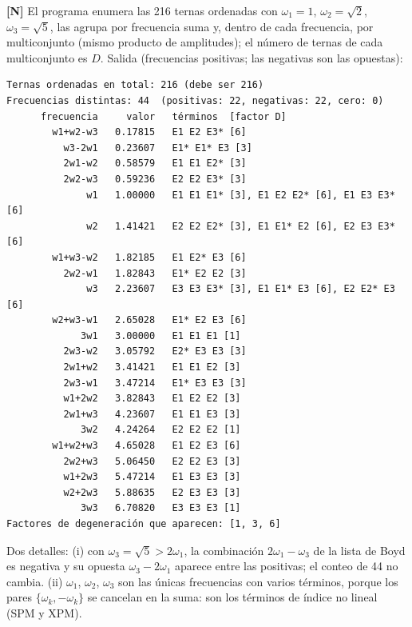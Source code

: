  \textbf{[N]} El programa enumera las 216 ternas ordenadas con $\omega_1=1$, $\omega_2=\sqrt2$, $\omega_3=\sqrt5$, las agrupa por frecuencia suma y, dentro de cada frecuencia, por multiconjunto (mismo producto de amplitudes); el número de ternas de cada multiconjunto es $D$.
Salida (frecuencias positivas; las negativas son las opuestas):
\begin{Verbatim}
Ternas ordenadas en total: 216 (debe ser 216)
Frecuencias distintas: 44  (positivas: 22, negativas: 22, cero: 0)
      frecuencia     valor   términos  [factor D]
        w1+w2-w3   0.17815   E1 E2 E3* [6]
          w3-2w1   0.23607   E1* E1* E3 [3]
          2w1-w2   0.58579   E1 E1 E2* [3]
          2w2-w3   0.59236   E2 E2 E3* [3]
              w1   1.00000   E1 E1 E1* [3], E1 E2 E2* [6], E1 E3 E3* [6]
              w2   1.41421   E2 E2 E2* [3], E1 E1* E2 [6], E2 E3 E3* [6]
        w1+w3-w2   1.82185   E1 E2* E3 [6]
          2w2-w1   1.82843   E1* E2 E2 [3]
              w3   2.23607   E3 E3 E3* [3], E1 E1* E3 [6], E2 E2* E3 [6]
        w2+w3-w1   2.65028   E1* E2 E3 [6]
             3w1   3.00000   E1 E1 E1 [1]
          2w3-w2   3.05792   E2* E3 E3 [3]
          2w1+w2   3.41421   E1 E1 E2 [3]
          2w3-w1   3.47214   E1* E3 E3 [3]
          w1+2w2   3.82843   E1 E2 E2 [3]
          2w1+w3   4.23607   E1 E1 E3 [3]
             3w2   4.24264   E2 E2 E2 [1]
        w1+w2+w3   4.65028   E1 E2 E3 [6]
          2w2+w3   5.06450   E2 E2 E3 [3]
          w1+2w3   5.47214   E1 E3 E3 [3]
          w2+2w3   5.88635   E2 E3 E3 [3]
             3w3   6.70820   E3 E3 E3 [1]
Factores de degeneración que aparecen: [1, 3, 6]
\end{Verbatim}
Dos detalles: (i) con $\omega_3=\sqrt5>2\omega_1$, la combinación $2\omega_1-\omega_3$ de la lista de Boyd es negativa y su opuesta $\omega_3-2\omega_1$ aparece entre las positivas; el conteo de 44 no cambia. (ii) $\omega_1$, $\omega_2$, $\omega_3$ son las únicas frecuencias con varios términos, porque los pares $\{\omega_k,-\omega_k\}$ se cancelan en la suma: son los términos de índice no lineal (SPM y XPM).


